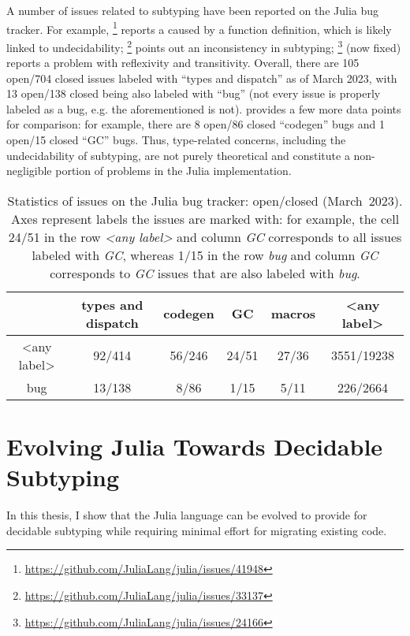 A number of issues related to subtyping have been reported
on the Julia bug tracker. For example,
\href{https://github.com/JuliaLang/julia/issues/41948}{}\footnote{
    \url{https://github.com/JuliaLang/julia/issues/41948}
} reports a  caused by a function definition,
which is likely linked to undecidability;
\href{https://github.com/JuliaLang/julia/issues/33137}{}\footnote{
    \url{https://github.com/JuliaLang/julia/issues/33137}
} points out an inconsistency in subtyping; %
\href{https://github.com/JuliaLang/julia/issues/24166}{}\footnote{
    \url{https://github.com/JuliaLang/julia/issues/24166} 
} (now fixed) reports a problem with reflexivity and transitivity.
Overall, there are 105 open/704 closed issues labeled with ``types and
dispatch'' as of March 2023,
with 13 open/138 closed being also labeled with ``bug''
(not every issue is properly labeled as a bug,
e.g. the aforementioned
\href{https://github.com/JuliaLang/julia/issues/24166}{} is not).
 provides a few more data points for comparison:
for example, there are 8 open/86 closed ``codegen'' bugs
and 1 open/15 closed ``GC'' bugs.
Thus, type-related concerns, including the undecidability of subtyping,
are not purely theoretical and
constitute a non-negligible portion of problems in the Julia implementation.

\begin{table}[t]
\caption{Statistics of issues on the Julia bug tracker: open/closed (March~2023).
Axes represent labels the issues are marked with: for example, the cell
24/51 in the row \emph{<any label>} and column \emph{GC} corresponds to all
issues labeled with \emph{GC}, whereas 1/15 in the row \emph{bug} and column 
\emph{GC} corresponds to \emph{GC} issues that are also labeled with \emph{bug}.
}\label{tab:julia-issues-stats}
\vspace*{0.25em}
\centering\footnotesize
\begin{tabular}{c|ccccc}
 & types and dispatch & codegen & GC & macros & <any label> \\
\midrule
<any label> &
  92/414 & 56/246 & 24/51 & 27/36 & 3551/19238 \\
bug &
  13/138 & 8/86 & 1/15 & 5/11 & 226/2664
\end{tabular}
\end{table}


\section{Evolving Julia Towards Decidable Subtyping}

In this thesis, I show that
the Julia language can be evolved to provide for decidable subtyping while
requiring minimal effort for migrating existing code.

